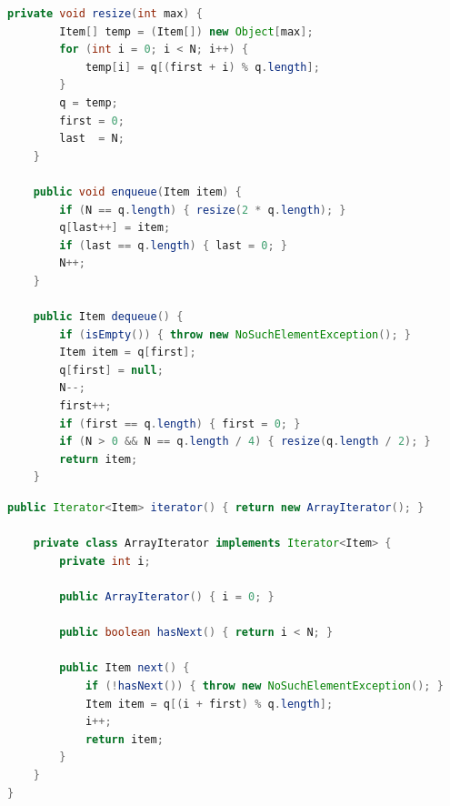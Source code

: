 \documentclass[8pt,a4paper,compress]{beamer}
\begin{document}
\begin{frame}[fragile]
\pause

\begin{lstlisting}[language=Java,style=focusin]
    private void resize(int max) {
        Item[] temp = (Item[]) new Object[max];
        for (int i = 0; i < N; i++) { 
            temp[i] = q[(first + i) % q.length]; 
        }
        q = temp;
        first = 0;
        last  = N;
    }

    public void enqueue(Item item) {
        if (N == q.length) { resize(2 * q.length); }
        q[last++] = item; 
        if (last == q.length) { last = 0; }
        N++;
    }

    public Item dequeue() {
        if (isEmpty()) { throw new NoSuchElementException(); }
        Item item = q[first];
        q[first] = null; 
        N--;
        first++;
        if (first == q.length) { first = 0; }
        if (N > 0 && N == q.length / 4) { resize(q.length / 2); } 
        return item;
    }

\end{lstlisting}
\end{frame}

\begin{frame}[fragile]
\pause

\begin{lstlisting}[language=Java,style=focusin]
    public Iterator<Item> iterator() { return new ArrayIterator(); }

    private class ArrayIterator implements Iterator<Item> {
        private int i;

        public ArrayIterator() { i = 0; } 
        
        public boolean hasNext() { return i < N; }

        public Item next() {
            if (!hasNext()) { throw new NoSuchElementException(); }
            Item item = q[(i + first) % q.length];
            i++;
            return item;
        }
    }
}
\end{lstlisting}
\end{frame}
\end{document}
